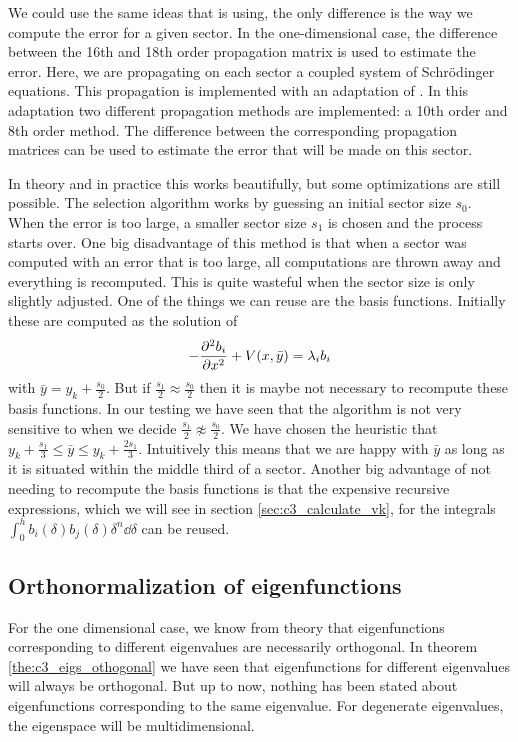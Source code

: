 We could use the same ideas that \matslise{} is using, the only difference is the way we compute the error for a given sector. In the one-dimensional case, the difference between the 16th and 18th order propagation matrix is used to estimate the error. Here, we are propagating on each sector a coupled system of Schrödinger equations. This propagation is implemented with an adaptation of \matscs{} \cite{ledoux_numerical_2007}. In this adaptation two different propagation methods are implemented: a 10th order and 8th order method. The difference between the corresponding propagation matrices can be used to estimate the error that will be made on this sector.

In theory and in practice this works beautifully, but some optimizations are still possible. The selection algorithm works by guessing an initial sector size $s_0$. When the error is too large, a smaller sector size $s_1$ is chosen and the process starts over. One big disadvantage of this method is that when a sector was computed with an error that is too large, all computations are thrown away and everything is recomputed. This is quite wasteful when the sector size is only slightly adjusted. One of the things we can reuse are the basis functions. Initially these are computed as the solution of
$$
  -\pdv[2]{b_i}{x} + V(x, \bar{y}) = \lambda_i b_i
$$
with $\bar{y} = y_{k} + \frac{s_0}{2}$. But if $\frac{s_1}{2} \approx \frac{s_0}{2}$ then it is maybe not necessary to recompute these basis functions. In our testing we have seen that the algorithm is not very sensitive to when we decide $\frac{s_1}{2} \not\approx
\frac{s_0}{2}$. We have chosen the heuristic that $y_k + \frac{s_1}{3} \leq \bar{y} \leq y_k + \frac{2 s_1}{3}$. Intuitively this means that we are happy with $\bar{y}$ as long as it is situated within the middle third of a sector. Another big advantage of not needing to recompute the basis functions is that the expensive recursive expressions, which we will see in section \ref{sec:c3_calculate_vk}, for the integrals $\int_{0}^{h} b_i(\delta)b_j(\delta)\delta^n \dd \delta $ can be reused.

\subsection{Orthonormalization of eigenfunctions}\label{sec:c3_improvement_orthonormalization}

For the one dimensional case, we know from theory that eigenfunctions corresponding to different eigenvalues are necessarily orthogonal. In theorem \ref{the:c3_eigs_othogonal} we have seen that eigenfunctions for different eigenvalues will always be orthogonal. But up to now, nothing has been stated about eigenfunctions corresponding to the same eigenvalue. For degenerate eigenvalues, the eigenspace will be multidimensional. 


